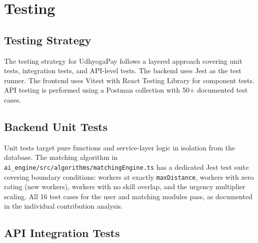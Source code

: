 \documentclass[12pt,a4paper]{report}
\begin{document}
\chapter{Testing}

\section{Testing Strategy}

The testing strategy for UdhyogaPay follows a layered approach covering unit tests, integration tests, and API-level tests. The backend uses Jest as the test runner. The frontend uses Vitest with React Testing Library for component tests. API testing is performed using a Postman collection with 50+ documented test cases.

\section{Backend Unit Tests}

Unit tests target pure functions and service-layer logic in isolation from the database. The matching algorithm in \texttt{ai\_engine/src/algorithms/matchingEngine.ts} has a dedicated Jest test suite covering boundary conditions: workers at exactly \texttt{maxDistance}, workers with zero rating (new workers), workers with no skill overlap, and the urgency multiplier scaling. All 16 test cases for the user and matching modules pass, as documented in the individual contribution analysis.

\section{API Integration Tests}
\end{document}
